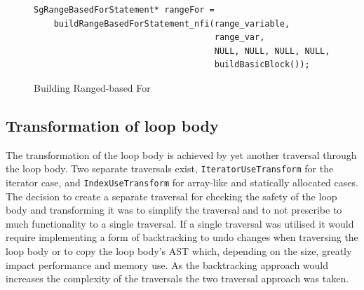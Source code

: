 \documentclass[bsc,frontabs,singlespacing,parskip,deptreport]{infthesis}
\begin{document}
\begin{figure}[H]
    \centering
    \begin{verbatim}
SgRangeBasedForStatement* rangeFor =
    buildRangeBasedForStatement_nfi(range_variable,
                                    range_var,
                                    NULL, NULL, NULL, NULL,
                                    buildBasicBlock());	
    \end{verbatim}
    \caption{Building Ranged-based For}
    \label{fig:range-based-for-stmt}
\end{figure}

\subsection{Transformation of loop body}

The transformation of the loop body is achieved by yet another traversal through the loop body. Two separate traversals exist, \texttt{IteratorUseTransform} for the iterator case, and \texttt{IndexUseTransform} for array-like and statically allocated cases. The decision to create a separate traversal for checking the safety of the loop body and transforming it was to simplify the traversal and to not prescribe to much functionality to a single traversal. If a single traversal was utilised it would require implementing a form of backtracking to undo changes when traversing the loop body or to copy the loop body's AST which, depending on the size, greatly impact performance and memory use. As the backtracking approach would increases the complexity of the traversals the two traversal approach was taken.
\end{document}
